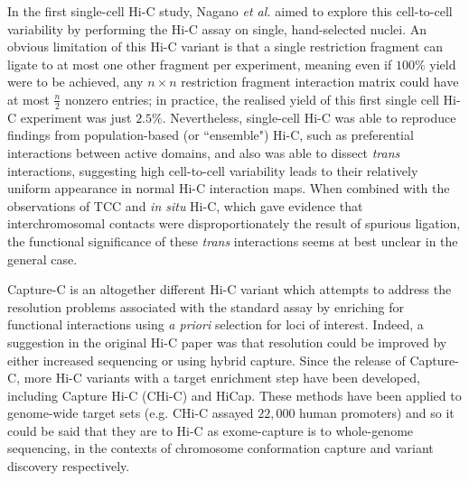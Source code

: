 \documentclass[a4paper,11pt,oneside]{book}
\begin{document}
In the first single-cell Hi-C study, Nagano \emph{et al.}\cite{Nagano2013} aimed to explore this cell-to-cell variability by performing the Hi-C assay on single, hand-selected nuclei. An obvious limitation of this Hi-C variant is that a single restriction fragment can ligate to at most one other fragment per experiment, meaning even if $100\%$ yield were to be achieved, any $n \times n$ restriction fragment interaction matrix could have at most $\frac{n}{2}$ nonzero entries; in practice, the realised yield of this first single cell Hi-C experiment was just $2.5\%$.\cite{Nagano2013} Nevertheless, single-cell Hi-C was able to reproduce findings from population-based (or ``ensemble") Hi-C, such as preferential interactions between active domains, and also was able to dissect \emph{trans} interactions, suggesting high cell-to-cell variability leads to their relatively uniform appearance in normal Hi-C interaction maps.\cite{Nagano2013} When combined with the observations of TCC and \emph{in situ} Hi-C, which gave evidence that interchromosomal contacts were disproportionately the result of spurious ligation,\cite{Kalhor2012} the functional significance of these \emph{trans} interactions seems at best unclear in the general case.

Capture-C is an altogether different Hi-C variant which attempts to address the resolution problems associated with the standard assay by enriching for functional interactions using \emph{a priori} selection for loci of interest.\cite{Hughes2014} Indeed, a suggestion in the original Hi-C paper was that resolution could be improved by either increased sequencing or using hybrid capture.\cite{Lieberman2009} Since the release of Capture-C, more Hi-C variants with a target enrichment step have been developed, including Capture Hi-C (CHi-C)\cite{Dryden2014} and HiCap.\cite{Sahlen2015} These methods have been applied to genome-wide target sets (e.g. CHi-C assayed $22,000$ human promoters\cite{Mifsud2015}) and so it could be said that they are to Hi-C as exome-capture is to whole-genome sequencing, in the contexts of chromosome conformation capture and variant discovery respectively. 

\end{document}
